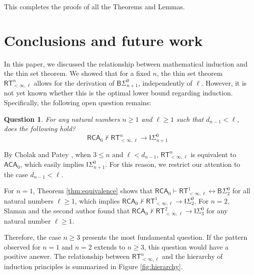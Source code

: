 \documentclass[10pt,reqno]{amsart}
\newtheorem{question}[theorem]{Question}
\numberwithin{equation}{section}
\begin{document}
This completes the proofs of all the Theorems and Lemmas.
\section{Conclusions and future work}
In this paper, we discussed the relationship between mathematical induction and the thin set theorem. We showed that for a fixed $n$, the thin set theorem $\mathsf{RT}_{<\infty,\ell}^{n}$ allows for the derivation of $\mathsf{B}\Sigma_{n+1}^{0}$, independently of $\ell$. However, it is not yet known whether this is the optimal lower bound regarding induction. Specifically, the following open question remains:


\begin{question}
For any natural numbers $n \ge 1$ and $\ell \ge 1$ such that $d_{n-1}<\ell$, does the following hold?
\[ \mathsf{RCA}_0\not\vdash\mathsf{RT}_{<\infty,\ell}^{n}\rightarrow\mathsf{I}\Sigma_{n+1}^{0} \]
\end{question}
By Cholak and Patey \cite{Cholak-Patey}, when $3\le n$ and $\ell < d_{n-1}$, $\mathsf{RT}_{<\infty,\ell}^{n}$ is equivalent to $\mathsf{ACA}_0$, which easily implies $\mathsf{I}\Sigma_{n+1}^{0}$. For this reason, we restrict our attention to the case $d_{n-1}<\ell$.


For $n=1$, Theorem \ref{thm:equivalence} shows that $\mathsf{RCA}_0\vdash\mathsf{RT}_{<\infty,\ell}^{1}\leftrightarrow\mathsf{B}\Sigma_{2}^{0}$ for all natural numbers $\ell \ge 1$, which implies $\mathsf{RCA}_0\not\vdash\mathsf{RT}_{<\infty,\ell}^{1}\rightarrow\mathsf{I}\Sigma_{2}^{0}$. For $n=2$, Slaman and the second author \cite{Slaman-Yokoyama} found that $\mathsf{RCA}_0\not\vdash\mathsf{RT}_{<\infty,\ell}^{2}\rightarrow\mathsf{I}\Sigma_{3}^{0}$ for any natural number $\ell\ge 1$.


Therefore, the case $n \ge 3$ presents the most fundamental question. If the pattern observed for $n=1$ and $n=2$ extends to $n \ge 3$, this question would have a positive answer. The relationship between $\mathsf{RT}_{<\infty,\ell}^n$ and the hierarchy of induction principles is summarized in Figure \ref{fig:hierarchy}.
\end{document}
